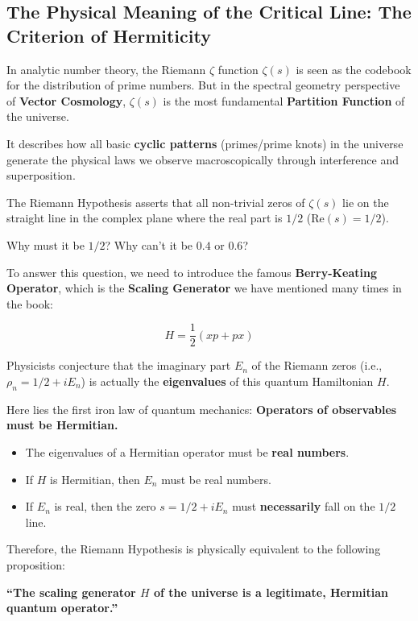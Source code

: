 \subsection{The Physical Meaning of the Critical Line: The Criterion of Hermiticity}

In analytic number theory, the Riemann $\zeta$ function $\zeta(s)$ is seen as the codebook for the distribution of prime numbers. But in the spectral geometry perspective of \textbf{Vector Cosmology}, $\zeta(s)$ is the most fundamental \textbf{Partition Function} of the universe.

It describes how all basic \textbf{cyclic patterns} (primes/prime knots) in the universe generate the physical laws we observe macroscopically through interference and superposition.

The Riemann Hypothesis asserts that all non-trivial zeros of $\zeta(s)$ lie on the straight line in the complex plane where the real part is \textbf{$1/2$} ($\text{Re}(s) = 1/2$).

Why must it be \textbf{$1/2$}? Why can't it be $0.4$ or $0.6$?

To answer this question, we need to introduce the famous \textbf{Berry-Keating Operator}, which is the \textbf{Scaling Generator} we have mentioned many times in the book:

$$H = \frac{1}{2}(xp + px)$$

Physicists conjecture that the imaginary part $E_n$ of the Riemann zeros (i.e., $\rho_n = 1/2 + iE_n$) is actually the \textbf{eigenvalues} of this quantum Hamiltonian $H$.

Here lies the first iron law of quantum mechanics: \textbf{Operators of observables must be Hermitian.}

\begin{itemize}
\item The eigenvalues of a Hermitian operator must be \textbf{real numbers}.

\item If $H$ is Hermitian, then $E_n$ must be real numbers.

\item If $E_n$ is real, then the zero $s = 1/2 + iE_n$ must \textbf{necessarily} fall on the $1/2$ line.
\end{itemize}

Therefore, the Riemann Hypothesis is physically equivalent to the following proposition:

\textbf{``The scaling generator $H$ of the universe is a legitimate, Hermitian quantum operator.''}


